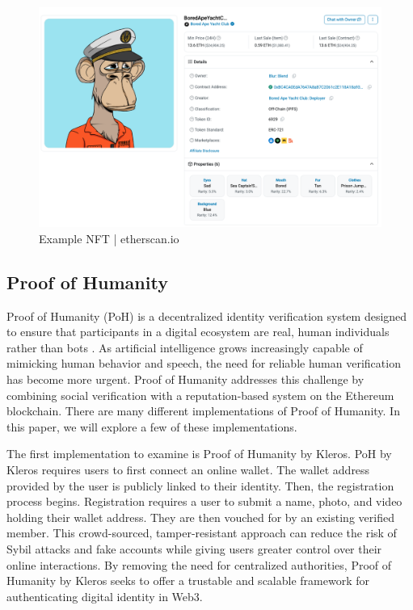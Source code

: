 \documentclass[conference]{IEEEtran}
\begin{document}
\begin{figure}[h!]
    \centering
    \includegraphics[width=0.9\linewidth]{nft-example.png}
    \caption{Example NFT | etherscan.io}
    \label{fig:nft-exp}
\end{figure}

\subsection{Proof of Humanity}
Proof of Humanity (PoH) is a decentralized identity verification system designed to ensure that participants in a digital ecosystem are real, human individuals rather than bots \cite{what-is-poh}. As artificial intelligence grows increasingly capable of mimicking human behavior and speech, the need for reliable human verification has become more urgent. Proof of Humanity addresses this challenge by combining social verification with a reputation-based system on the Ethereum blockchain. There are many different implementations of Proof of Humanity. In this paper, we will explore a few of these implementations.

The first implementation to examine is Proof of Humanity by Kleros. PoH by Kleros requires users to first connect an online wallet. The wallet address provided by the user is publicly linked to their identity. Then, the registration process begins. Registration requires a user to submit a name, photo, and video holding their wallet address. They are then vouched for by an existing verified member. This crowd-sourced, tamper-resistant approach can reduce the risk of Sybil attacks and fake accounts while giving users greater control over their online interactions. By removing the need for centralized authorities, Proof of Humanity by Kleros seeks to offer a trustable and scalable framework for authenticating digital identity in Web3.
\end{document}
